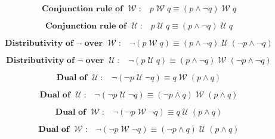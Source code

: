\documentclass[12pt, fleqn, leqno]{article}
\newcommand{\Until}{\;\mathcal{U}\;}
\newcommand{\Wait}{\;\mathcal{W}\;}
\newcommand{\spacer}{\vspace{-30pt}}
\begin{document}
\begin{equation}\label{E:conRuleWait}
\textbf{Conjunction rule of $\Wait$:}\quad p\Wait q\equiv (p\land \neg q)\Wait q
\end{equation}

\spacer

\begin{equation}\label{E:conRuleUntil}
\textbf{Conjunction rule of $\Until$:}\quad p\Until q\equiv (p\land \neg q)\Until q
\end{equation}

\spacer

\begin{equation}\label{E:notWait2}
\textbf{Distributivity of $\neg$ over $\Wait$:}\quad \neg(p\Wait q)\equiv (p\land \neg q)\Until(\neg p\land \neg q)
\end{equation}

\spacer

\begin{equation}\label{E:notUntil2}
\textbf{Distributivity of $\neg$ over $\Until$:}\quad \neg(p\Until q)\equiv (p\land \neg q)\Wait(\neg p\land \neg q)
\end{equation}

\spacer
\begin{equation}\label{E:DualUntil1}
\textbf{Dual of $\Until$:}\quad \neg (\neg p \Until \neg q) \equiv q \Wait (p \land q)
\end{equation}

\spacer

\begin{equation}\label{E:DualUntil2}
\textbf{Dual of $\Until$:}\quad \neg (\neg p \Until \neg q) \equiv ( \neg p \land q) \Wait (p \land q)
\end{equation}

\spacer

\begin{equation}\label{E:DualWait1}
\textbf{Dual of $\Wait$:}\quad \neg (\neg p \Wait \neg q) \equiv q \Until (p \land q)
\end{equation}

\spacer

\begin{equation}\label{E:DualWait2}
\textbf{Dual of $\Wait$:}\quad \neg (\neg p \Wait \neg q) \equiv (\neg p \land q) \Until (p \land q)
\end{equation}
\end{document}
